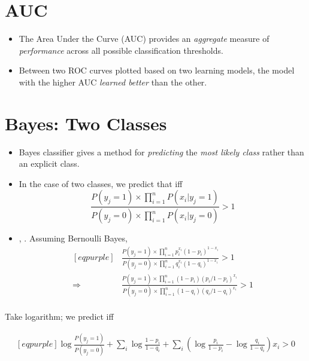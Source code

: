 \documentclass[
	number={3},
	title={Na\"iive Bayes Learning}
]{cs584notes}
\begin{document}
\section{AUC}\label{sec:auc}
\begin{itemize}
	\item The Area Under the Curve (AUC) provides an \emph{aggregate} measure of \emph{performance} across all possible classification thresholds.
	\item Between two ROC curves plotted based on two learning models, the model with the higher AUC \emph{learned better} than the other.
\end{itemize}

\section{\Naive Bayes: Two Classes}\label{sec:naive-bayes:-two-classes}
\begin{itemize}
	\item \Naive Bayes classifier gives a method for \emph{predicting} the \emph{most likely class} rather than an explicit class.
	\item In the case of two classes,  we predict that  iff
	\textcolor{eqpurple}{\begin{equation*}
		\frac{P(y_{j} = 1) \times \prod_{i=1}^{n} P(x_{i}|y_{j}=1)}{P(y_{j} = 0) \times \prod_{i=1}^{n} P(x_{i}|y_{j}=0)} > 1
	\end{equation*}}
	\item {}, . Assuming Bernoulli \Naive Bayes,
	\begin{equation*}
	\begin{aligned}[eqpurple]
		&\frac{P(y_{j} = 1) \times \prod_{i=1}^{n} p_{i}^{x_{i}} (1 - p_{i})^{1 - x_{i}}}{P(y_{j} = 0) \times \prod_{i=1}^{n} q_{i}^{x_{i}} (1 - q_{i})^{1 - x_{i}}} > 1\\
		\Rightarrow & \frac{P(y_{j} = 1) \times \prod_{i=1}^{n} (1 - p_{i})(p_{i} / 1 - p_{i})^{x_{i}}}{P(y_{j} = 0) \times \prod_{i=1}^{n} (1 - q_{i})(q_{i} / 1 - q_{i})^{x_{i}}} > 1\\
	\end{aligned}
	\end{equation*}
\end{itemize}

Take logarithm; we predict  iff

\begin{equation*}
\begin{aligned}[eqpurple]
	\log \frac{P(y_{j}=1)}{P(y_{j}=0)} + \sum_{i}\log \frac{1-p_{i}}{1-q_{i}} + \sum_{i}\left( \log\frac{p_{i}}{1-p_{i}} - \log\frac{q_{i}}{1-q_{i}} \right)x_{i} > 0
\end{aligned}
\end{equation*}
\end{document}
